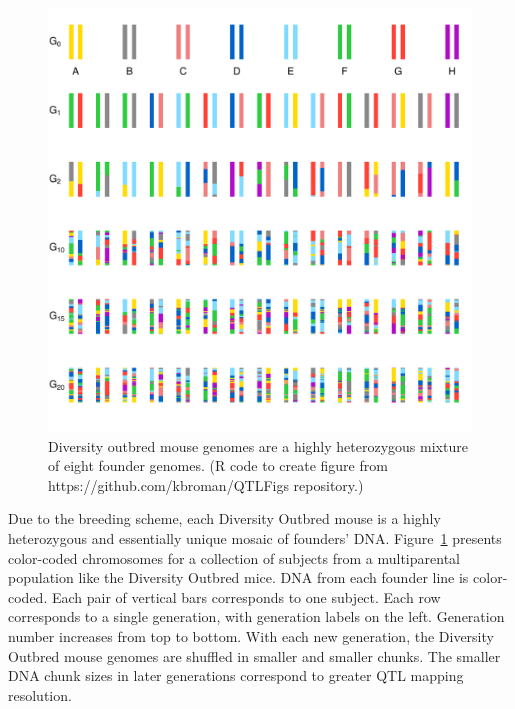 \documentclass[oneside]{book}\usepackage[]{graphicx}\usepackage[]{color}
\makeatletter
\def\maxwidth{ %
  \ifdim\Gin@nat@width>\linewidth
    \linewidth
  \else
    \Gin@nat@width
  \fi
}
\newenvironment{knitrout}{}{} %
\def\maxwidth{\ifdim\Gin@nat@width>\linewidth\linewidth\else\Gin@nat@width\fi}
\makeatother
\begin{document}
\begin{knitrout}
\color{fgcolor}\begin{figure}
\includegraphics[width=\maxwidth]{figure/do-1} \caption[Diversity outbred mouse genomes are a highly heterozygous mixture of eight founder genomes]{Diversity outbred mouse genomes are a highly heterozygous mixture of eight founder genomes. (R code to create figure from https://github.com/kbroman/QTLFigs repository.)}\label{fig:do}
\end{figure}


\end{knitrout}

Due to the breeding scheme, each Diversity Outbred mouse is a highly
heterozygous and essentially unique mosaic of
founders' DNA. Figure~\ref{fig:do} presents color-coded chromosomes for a collection of 
subjects from a multiparental population like the Diversity Outbred mice. DNA from each founder 
line is color-coded. Each pair of vertical bars corresponds to one subject. Each row corresponds to a single generation, with generation labels on the left. Generation number increases from top to bottom. 
With each new generation, the Diversity Outbred mouse genomes are shuffled
in smaller and smaller chunks.
The smaller DNA chunk sizes in later generations correspond to 
greater QTL mapping 
resolution.
\end{document}
